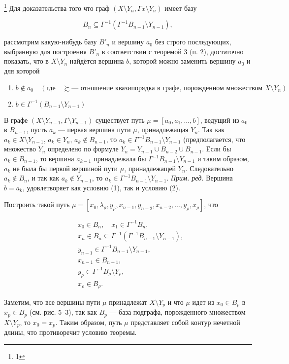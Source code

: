\footnote{1} Для доказательства того что граф $(X \setminus Y_n, \Gamma x \setminus Y_n)$ имеет базу

\[
B_n \subseteq \Gamma^{-1} (\Gamma^{-1} B_{n-1} \setminus Y_{n-1}),
\]

рассмотрим какую-нибудь базу $B'_n$ и вершину $a_0$ без строго последующих, выбранную для построения $B'_n$ в соответствии с теоремой 3 (п. 2), достаточно показать, что в $X \setminus Y_n$ найдётся вершина $b$, которой можно заменить вершину $a_0$ и для которой

\begin{enumerate}
    \item $b \notin a_0 \quad (\text{где} \quad \succsim \text{--- отношение квазипорядка в графе, порожденном множеством } X \setminus Y_n)$
    \item $b \in \Gamma^{-1}(B_{n-1} \setminus Y_{n-1})$
\end{enumerate}

В графе $(X \setminus Y_{n-1}, \Gamma \setminus Y_{n-1})$ существует путь $\mu = [a_0, a_1, \ldots, b]$, ведущий из $a_0$ в $B_{n-1}$, пусть $a_k$ --- первая вершина пути $\mu$, принадлежащая $Y_n$. Так как $a_k \in X \setminus Y_{n-1}$, $a_k \in Y_n$, $a_k \notin B_{n-1}$, то $a_k \in \Gamma^{-1}B_{n-1} \setminus Y_{n-1}$ (предполагается, что множество $Y_n$ определено по формуле $Y_n = Y_{n-1} \cup B_{n-2} \cup B_{n-1}$. Если бы $a_k \in B_{n-1}$, то вершина $a_{k-1}$ принадлежала бы $\Gamma^{-1}B_{n-1} \setminus Y_{n-1}$ и таким образом, $a_k$ не была бы первой вершиной пути $\mu$, принадлежащей $Y_n$. Следовательно $a_k \notin B_n$, и так как $a_k \notin Y_{n-1}$, то $a_k \in \Gamma^{-1}B_{n-1} \setminus Y_{n-1}$. \textit{Прим. ред.} Вершина $b = a_k$, удовлетворяет как условию (1), так и условию (2).

Построить такой путь $\mu = [x_0, \lambda_\rho, y_\rho, x_{n-1}, y_{n-2}, x_{n-2}, \ldots, y_\rho, x_\rho]$, что

\begin{align*}
    &x_0 \in B_n, \quad x_1 \in \Gamma^{-1}B_n, \\
    &x_n \in B_n \subseteq \Gamma^{-1}(\Gamma^{-1}B_{n-1} \setminus Y_{n-1}), \\
    &y_{n-1} \in \Gamma^{-1}B_{n-1} \setminus Y_{n-1}, \\
    &x_{n-1} \in B_{n-1}, \\
    &y_\rho \in \Gamma^{-1}B_\rho \setminus Y_\rho, \\
    &x_\rho \in B_\rho.
\end{align*}

Заметим, что все вершины пути $\mu$ принадлежат $X \setminus Y_p$ и что $\mu$ идет из $x_0 \in B_p$ в $x_p \in B_p$ (см. рис. 5--3), так как $B_p$ --- база подграфа, порожденного множеством $X \setminus Y_p$, то $x_0 = x_p$. Таким образом, путь $\mu$ представляет собой контур нечетной длины, что противоречит условию теоремы.